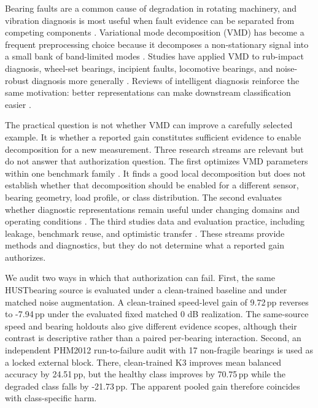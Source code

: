 \documentclass[11pt]{article}
\newcommand{\SI}[2]{#1\,\ensuremath{#2}}
\newcommand{\pp}{\mathrm{pp}}
\begin{document}
Bearing faults are a common cause of degradation in rotating machinery, and
vibration diagnosis is most useful when fault evidence can be separated from
competing components \citep{randall2011}. Variational mode decomposition (VMD)
has become a frequent preprocessing choice because it decomposes a
non-stationary signal into a small bank of band-limited modes
\citep{vmd_original}. Studies have applied VMD to rub-impact diagnosis,
wheel-set bearings, incipient faults, locomotive bearings, and noise-robust
diagnosis more generally
\citep{wang2015vmd,li2017independence,dibaj2021incipient,xu2023adaptive,
adaptive_range_vmd}. Reviews of intelligent diagnosis reinforce the same
motivation: better representations can make downstream classification easier
\citep{deep_review}.

The practical question is not whether VMD can improve a carefully selected
example. It is whether a reported gain constitutes sufficient evidence to
enable decomposition for a new measurement. Three research streams are relevant
but do not answer that authorization question. The first optimizes VMD
parameters within one benchmark family
\citep{wang2015vmd,li2017independence,zheng2019dichotomy,jiang2021adaptive,
zhang2018adaptive,xu2023adaptive,ni2022fivmd,song2022selfadaptive}. It finds a
good local decomposition but does not establish whether that decomposition
should be enabled for a different sensor, bearing geometry, load profile, or
class distribution. The second evaluates whether diagnostic representations
remain useful under changing domains and operating conditions
\citep{cross_domain_review,hustbearing_2024}. The third studies data and
evaluation practice, including leakage, benchmark reuse, and optimistic
transfer \citep{vieira2026realistic}. These streams provide methods and
diagnostics, but they do not determine what a reported gain authorizes.

We audit two ways in which that authorization can fail. First, the same HUSTbearing
source is evaluated under a clean-trained baseline and under matched noise
augmentation. A clean-trained speed-level gain of \SI{9.72}{\pp} reverses to
\SI{-7.94}{\pp} under the evaluated fixed matched 0 dB realization. The
same-source speed and bearing holdouts also give
different evidence scopes, although their contrast is descriptive rather than a
paired per-bearing interaction. Second, an independent PHM2012 run-to-failure
audit with 17 non-fragile bearings is used as a locked external block. There,
clean-trained K3 improves mean balanced accuracy by \SI{24.51}{\pp}, but the
healthy class improves by \SI{70.75}{\pp} while the degraded class falls by
\SI{-21.73}{\pp}. The apparent pooled gain therefore coincides with
class-specific harm.
\end{document}
